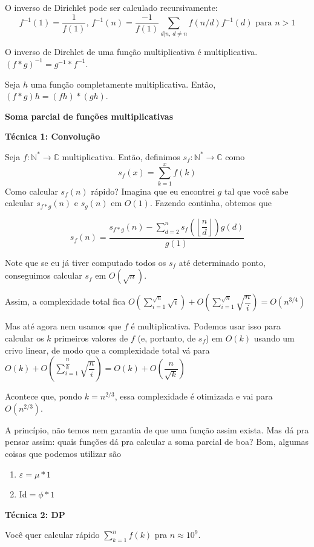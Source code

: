 O inverso de Dirichlet pode ser calculado recursivamente:
$$ f^{-1}(1) = \dfrac{1}{f(1)}, \, f^{-1}(n) = \dfrac{-1}{f(1)} \sum\limits_{d | n, \, d \neq n} f(n/d) f^{-1}(d) \text{ para } n>1$$

O inverso de Dirchlet de uma função multiplicativa é multiplicativa. $(f * g)^{-1} = g^{-1} * f^{-1}$.

Seja $h$ uma função completamente multiplicativa. Então, $(f * g) h = (fh) * (gh)$.

\textbf{Soma parcial de funções multiplicativas}

\textbf{Técnica 1: Convolução}

Seja $f : \mathbb{N}^* \to \mathbb{C}$ multiplicativa. Então, definimos $s_f : \mathbb{N}^* \to \mathbb{C}$ como
$$ s_f(x) = \sum\limits_{k=1}^x f(k)$$
Como calcular $s_f(n)$ rápido? Imagina que eu encontrei $g$ tal que você sabe calcular $s_{f * g}(n)$ e $s_g(n)$ em $O(1)$.
Fazendo continha, obtemos que 

$$ s_f(n) = \dfrac{s_{f * g}(n) - \sum\limits_{d=2}^{n} s_f \left( \left\lfloor \dfrac{n}{d} \right\rfloor  \right) g(d) }{g(1)}$$

Note que se eu já tiver computado todos os $s_f$ até determinado ponto, conseguimos calcular $s_f$ em $O(\sqrt{n})$.

Assim, a complexidade total fica $O(\sum\limits_{i=1}^{\sqrt{n}} \sqrt{i}) + O(\sum\limits_{i=1}^{\sqrt{n}} \sqrt{\dfrac{n}{i}}) = O(n^{3/4})$

Mas até agora nem usamos que $f$ é multiplicativa. Podemos usar isso para calcular os $k$ primeiros valores de $f$ (e, portanto, de $s_f$)
em $O(k)$ usando um crivo linear, de modo que a complexidade total vá para $O(k) + O\left( \sum\limits_{i=1}^{\dfrac{n}{k}} \sqrt{\dfrac{n}{i}} \right) = O(k) + O(\dfrac{n}{\sqrt{k}})$

Acontece que, pondo $k = n^{2/3}$, essa complexidade é otimizada e vai para $O(n^{2/3})$.

A princípio, não temos nem garantia de que uma função assim exista. Mas dá pra pensar assim: quais funções dá pra calcular
a soma parcial de boa? Bom, algumas coisas que podemos utilizar são
\begin{enumerate}
    \item $\varepsilon = \mu * 1$
    \item $\text{Id} = \phi * 1$
\end{enumerate}

\textbf{Técnica 2: DP}

Você quer calcular rápido $\sum\limits_{k=1}^n f(k)$ pra $n \approx 10^9$. 

